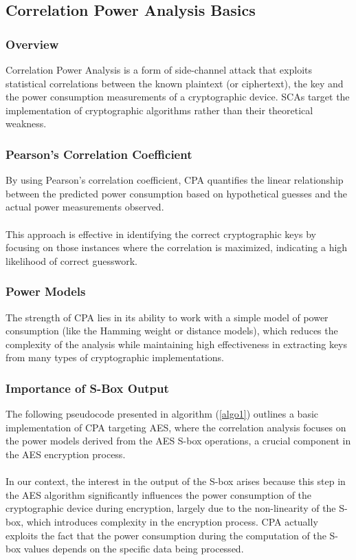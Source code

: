 \documentclass[a4paper,10pt]{article}
\begin{document}
\subsection{Correlation Power Analysis Basics}
\subsubsection{Overview}
Correlation Power Analysis is a form of side-channel attack that exploits statistical correlations between the known plaintext (or ciphertext), the key and the power consumption measurements of a cryptographic device. 
SCAs target the implementation of cryptographic algorithms rather than their theoretical weakness. 

\subsubsection{Pearson’s Correlation Coefficient}
By using Pearson's correlation coefficient, CPA quantifies the linear relationship between the predicted power consumption based on hypothetical guesses and the actual power measurements observed. \\
\\
This approach is effective in identifying the correct cryptographic keys by focusing on those instances where the correlation is maximized, indicating a high likelihood of correct guesswork. 
\subsubsection{Power Models}
The strength of CPA lies in its ability to work with a simple model of power consumption (like the Hamming weight or distance models), which reduces the complexity of the analysis while maintaining high effectiveness in extracting keys from many types of cryptographic implementations.

\subsubsection{Importance of S-Box Output}
The following pseudocode presented in algorithm (\ref{algo1}) outlines a basic implementation of CPA targeting AES, where the correlation analysis focuses on the power models derived from the AES S-box operations, a crucial component in the AES encryption process. 
\\
\\
In our context, the interest in the output of the S-box arises because this step in the AES algorithm significantly influences the power consumption of the cryptographic device during encryption, largely due to the non-linearity of the S-box, which introduces complexity in the encryption process.
CPA actually exploits the fact that the power consumption during the computation of the S-box values depends on the specific data being processed.
\end{document}
